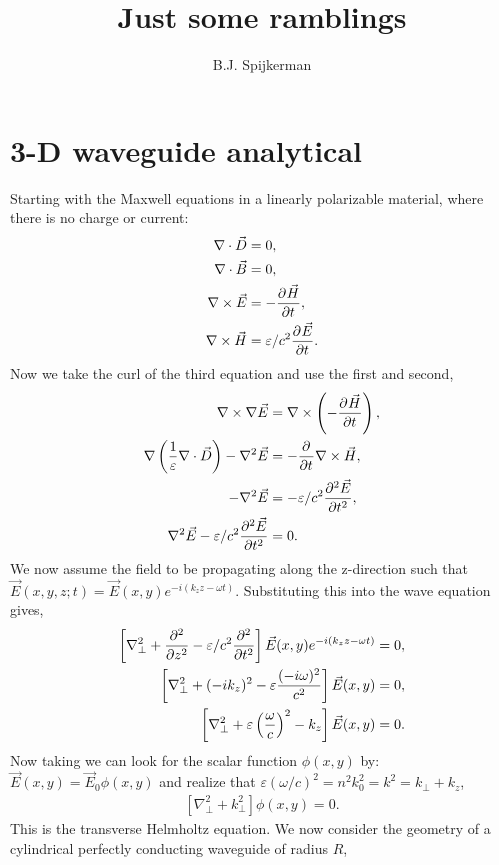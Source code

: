 \documentclass{article}
\title{Just some ramblings}
\author{B.J. Spijkerman}
\begin{document}
\maketitle

\section{3-D waveguide analytical}
Starting with the Maxwell equations in a linearly polarizable material, where there is no charge or current:
\begin{align*}
  \nabla\cdot\vec{D}&=0,\\
  \nabla\cdot\vec{B}&=0,\\
  \nabla\times\vec{E}&=-\pdv[]{\vec{H}}{t},\\
  \nabla\times\vec{H}&=\varepsilon/c^2\pdv[]{\vec{E}}{t}.\\
\end{align*}
Now we take the curl of the third equation and use the first and second,
\begin{align*}
  \nabla\times\nabla\vec{E}&=\nabla\times\left(-\pdv[]{\vec{H}}{t}\right),\\
  \nabla\left(\frac{1}{\varepsilon}\nabla\cdot\vec{D}\right)-\nabla^2\vec{E}&=-\pdv[]{}{t}\nabla\times\vec{H},\\
  -\nabla^2\vec{E}&=-\varepsilon/c^2\pdv[2]{\vec{E}}{t},\\
  \nabla^2\vec{E}-\varepsilon/c^2\pdv[2]{\vec{E}}{t}&=0.
\end{align*}
We now assume the field to be propagating along the z-direction such that $\vec{E}(x,y,z;t)=\vec{E}(x,y)e^{-i(k_zz-\omega t)}$. Substituting this into the wave equation gives,
\begin{align*}
  \left[\nabla_{\perp}^2+\pdv[2]{}{z}-\varepsilon/c^2\pdv[2]{}{t}\right]\vec{E}(x,y)e^{-i(k_zz-\omega t)}&=0,\\
  \left[\nabla_{\perp}^2+(-ik_z)^2-\varepsilon\frac{(-i\omega)^2}{c^2}\right]\vec{E}(x,y)&=0,\\
  \left[\nabla_{\perp}^2+\varepsilon\left(\frac{\omega}{c}\right)^2-k_z\right]\vec{E}(x,y)&=0.
\end{align*}
Now taking we can look for the scalar function $\phi(x,y)$ by: $\vec{E}(x,y)=\vec{E}_0\phi(x,y)$ and realize that $\varepsilon\left(\omega/c\right)^2=n^2k_0^2=k^2=k_{\perp}+k_z$,
\begin{align*}
  \left[\nabla_{\perp}^2+k_{\perp}^2\right]\phi(x,y)=0.
\end{align*}
This is the transverse Helmholtz equation. We now consider the geometry of a cylindrical perfectly conducting waveguide of radius $R$,
\end{document}
